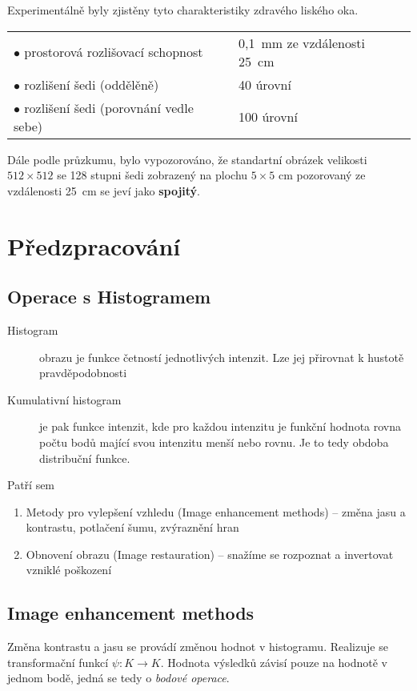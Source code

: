  Experimentálně byly zjistěny tyto charakteristiky  zdravého liského oka.
\medskip

\begin{tabular}{ll}
$\bullet$ prostorová rozlišovací schopnost& 0,1~mm ze vzdálenosti 25~cm\\
$\bullet$ rozlišení šedi (oddělěně) & 40 úrovní \\
$\bullet$ rozlišení šedi (porovnání vedle sebe) & 100 úrovní 
\end{tabular}

\medskip
\noindent Dále podle průzkumu, bylo vypozorováno, že standartní obrázek velikosti $512\times512$ se 128 stupni šedi 
zobrazený na plochu $5\times5$ cm pozorovaný ze vzdálenosti 25~cm se jeví jako {\bf spojitý}.

\section{Předzpracování}
\subsection{Operace s Histogramem}

\begin{description}
\item[Histogram] obrazu je funkce četností jednotlivých intenzit. Lze jej přirovnat k hustotě pravděpodobnosti
\item[Kumulativní histogram] je pak funkce intenzit, kde pro každou intenzitu je funkční hodnota rovna počtu bodů
 mající svou intenzitu menší nebo rovnu. Je to tedy obdoba distribuční funkce.
\end{description} 



Patří sem
\begin{enumerate}
\item Metody pro vylepšení vzhledu (Image enhancement methods) -- změna jasu a kontrastu, potlačení šumu, zvýraznění hran
\item Obnovení obrazu (Image restauration) -- snažíme se rozpoznat a invertovat vzniklé poškození
\end{enumerate}

\subsection{Image enhancement methods} 
Změna kontrastu a jasu se provádí změnou hodnot v histogramu. Realizuje se transformační funkcí $\psi:K\rightarrow K$.
Hodnota výsledků závisí pouze na hodnotě v jednom bodě, jedná se tedy o {\em bodové operace}.


